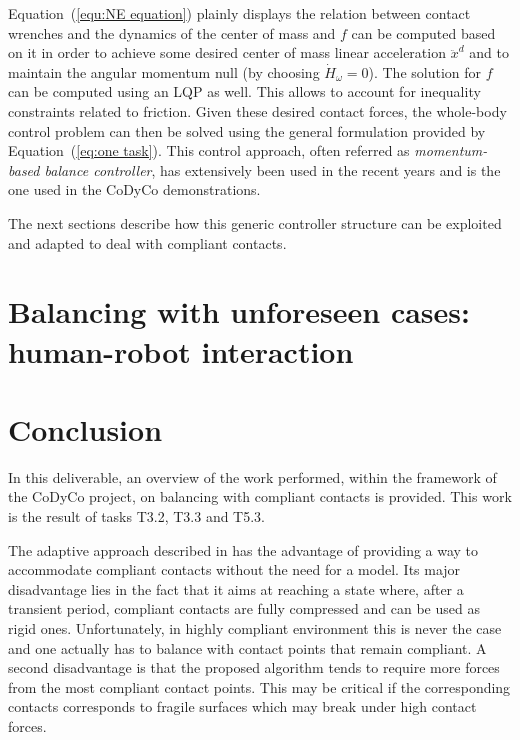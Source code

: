 \documentclass[12pt,a4paper,twoside]{article}
\begin{document}
Equation~(\ref{equ:NE equation}) plainly displays the relation between contact wrenches and the dynamics of the center of mass and $f$ can be computed based on it in order to achieve some desired center of mass linear acceleration $\ddot{x}^d$ and to maintain the angular momentum null (by choosing $\dot{H}_{\omega} = 0$). The solution for $f$ can be computed using an LQP as well. This allows to account for inequality constraints related to friction. Given these desired contact forces, the whole-body control problem can then be solved using the general formulation provided by Equation~(\ref{eq:one task}). This control approach, often referred as \textit{momentum-based balance controller}, has extensively been used in the recent years \cite{Lee&Goswami12,perrin_ISRR2015,Herzog2015} and is the one used in the CoDyCo demonstrations.

The next sections describe how this generic controller structure can be exploited and adapted to deal with compliant contacts.

\section{Balancing with unforeseen cases: human-robot interaction}




\section{Conclusion}

In this deliverable, an overview of the work performed, within the framework of the CoDyCo project, on balancing with compliant contacts is provided. This work is the result of tasks T3.2, T3.3 and T5.3.

The adaptive approach described in \cite{liu_IROS2015} has the advantage of providing a way to accommodate compliant contacts without the need for a model. Its major disadvantage lies in the fact that it aims at reaching a state where, after a transient period, compliant contacts are fully compressed and can be used as rigid ones. Unfortunately, in highly compliant environment this is never the case and one actually has to balance with contact points that remain compliant. A second disadvantage is that the proposed algorithm tends to require  more forces from the most compliant contact points. This may be critical if the corresponding contacts corresponds to fragile surfaces which may break under high contact forces.\\
\end{document}
